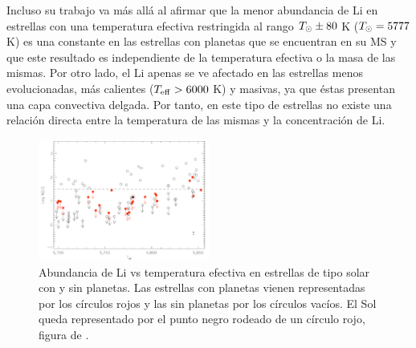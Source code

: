 Incluso su trabajo va más allá al afirmar que la menor abundancia de Li en estrellas con una temperatura efectiva restringida al rango $T_\odot \pm 80$ K ($T_\odot = 5777$ K) es una constante en las estrellas con planetas que se encuentran en su MS y que este resultado es independiente de la temperatura efectiva o la masa de las mismas. Por otro lado, el Li apenas se ve afectado en las estrellas menos evolucionadas, más calientes ($T_{\mathrm{eff}} > 6000$ K) y masivas, ya que éstas presentan una capa convectiva delgada. Por tanto, en este tipo de estrellas no existe una relación directa entre la temperatura de las mismas y la concentración de Li.\par

\begin{figure}
	\centering
	\includegraphics[width=0.5\textwidth]{img/tesis/li_abundances_planets.pdf}
	\caption{Abundancia de Li vs temperatura efectiva en estrellas de tipo solar con y sin planetas. Las estrellas con planetas vienen representadas por los círculos rojos y las sin planetas por los círculos vacíos. El Sol queda representado por el punto negro rodeado de un círculo rojo, figura de \cite{Israelian2009}.}
	\label{fig:li_abundances_planets}
\end{figure}

